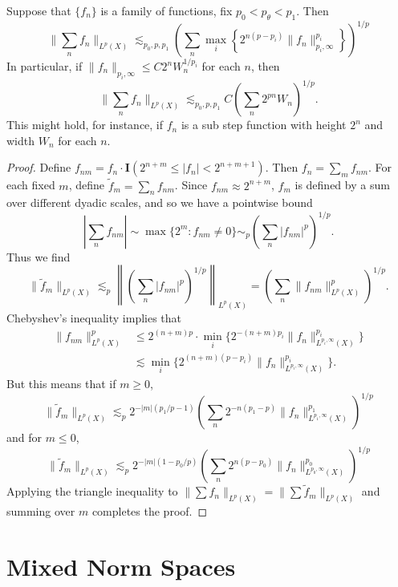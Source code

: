 \begin{theorem}
  Suppose that $\{ f_n \}$ is a family of functions, fix $p_0 < p_\theta < p_1$. Then
  \[ \| \sum_n f_n \|_{L^p(X)} \lesssim_{p_0,p,p_1} \left( \sum_n \max_i \left\{ 2^{n(p - p_i)} \| f_n \|_{p_i,\infty}^{p_i} \right\} \right)^{1/p} \]
  In particular, if $\| f_n \|_{p_i,\infty} \leq C 2^n W_n^{1/p_i}$ for each $n$, then
  \[ \| \sum_n f_n \|_{L^p(X)} \lesssim_{p_0,p,p_1} C \left( \sum_n 2^{pn} W_n \right)^{1/p}. \]
  This might hold, for instance, if $f_n$ is a sub step function with height $2^n$ and width $W_n$ for each $n$.
\end{theorem}
\begin{proof}
  Define $f_{nm} = f_n \cdot \mathbf{I}(2^{n+m} \leq |f_n| < 2^{n+m+1})$. Then $f_n = \sum_m f_{nm}$. For each fixed $m$, define $\tilde{f}_m = \sum_n f_{nm}$. Since $f_{nm} \approx 2^{n+m}$, $f_m$ is defined by a sum over different dyadic scales, and so we have a pointwise bound
  \[ |\sum_n f_{nm}| \sim \max \{ 2^m : f_{nm} \neq 0 \} \sim_p \left( \sum_n |f_{nm}|^p \right)^{1/p}. \]
  Thus we find
  \[ \| \tilde{f}_m \|_{L^p(X)} \lesssim_p \left\| \left( \sum_n |f_{nm}|^p \right)^{1/p} \right\|_{L^p(X)} = \left( \sum_n \| f_{nm} \|_{L^p(X)}^p \right)^{1/p}. \]
  Chebyshev's inequality implies that
  \begin{align*}
    \| f_{nm} \|_{L^p(X)}^p &\leq 2^{(n+m)p} \cdot \min_i \{ 2^{-(n+m) p_i} \| f_n \|_{L^{p_i,\infty}(X)}^{p_i} \}\\
    &\lesssim \min_i \{ 2^{(n+m)(p - p_i)} \| f_n \|_{L^{p_i,\infty}(X)}^{p_i} \}.
  \end{align*}
  But this means that if $m \geq 0$,
  \[ \| \tilde{f}_m \|_{L^p(X)} \lesssim_p 2^{-|m|(p_1/p - 1)} \left( \sum_n 2^{-n(p_1 - p)} \| f_n \|_{L^{p_1,\infty}(X)}^{p_1} \right)^{1/p} \]
  and for $m \leq 0$,
  \[ \| \tilde{f}_m \|_{L^p(X)} \lesssim_p 2^{-|m|(1 - p_0/p)} \left( \sum_n 2^{n(p - p_0)} \| f_n \|_{L^{p_0,\infty}(X)}^{p_0} \right)^{1/p} \]
  Applying the triangle inequality to $\| \sum f_n \|_{L^p(X)} = \| \sum \tilde{f}_m \|_{L^p(X)}$ and summing over $m$ completes the proof.
\end{proof}

\section{Mixed Norm Spaces}

